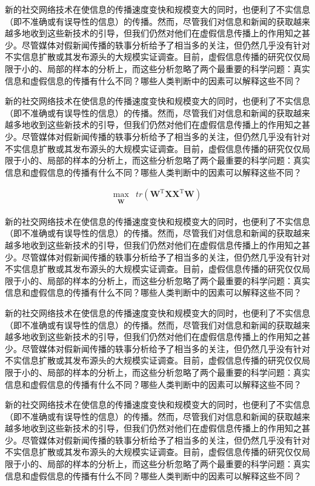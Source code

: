 \documentclass[a4paper,AutoFakeBold,oneside,12pt]{book}
\begin{document}
\begin{nopagenumber}
新的社交网络技术在使信息的传播速度变快和规模变大的同时，也便利了不实信息（即不准确或有误导性的信息）的传播。然而，尽管我们对信息和新闻的获取越来越多地收到这些新技术的引导，但我们仍然对他们在虚假信息传播上的作用知之甚少。尽管媒体对假新闻传播的轶事分析给予了相当多的关注，但仍然几乎没有针对不实信息扩散或其发布源头的大规模实证调查。目前，虚假信息传播的研究仅仅局限于小的、局部的样本的分析上，而这些分析忽略了两个最重要的科学问题：真实信息和虚假信息的传播有什么不同？哪些人类判断中的因素可以解释这些不同？

新的社交网络技术在使信息的传播速度变快和规模变大的同时，也便利了不实信息（即不准确或有误导性的信息）的传播。然而，尽管我们对信息和新闻的获取越来越多地收到这些新技术的引导，但我们仍然对他们在虚假信息传播上的作用知之甚少。尽管媒体对假新闻传播的轶事分析给予了相当多的关注，但仍然几乎没有针对不实信息扩散或其发布源头的大规模实证调查。目前，虚假信息传播的研究仅仅局限于小的、局部的样本的分析上，而这些分析忽略了两个最重要的科学问题：真实信息和虚假信息的传播有什么不同？哪些人类判断中的因素可以解释这些不同？

\begin{equation}
\label{PCA_goal_appx2}
\begin{aligned}
\max_{\substack{\bm{W}}}  &  tr(\bm{W}^\mathrm{T}\bm{X}\bm{X}^ \mathrm{T}\bm{W})
\end{aligned}
\end{equation}

新的社交网络技术在使信息的传播速度变快和规模变大的同时，也便利了不实信息（即不准确或有误导性的信息）的传播。然而，尽管我们对信息和新闻的获取越来越多地收到这些新技术的引导，但我们仍然对他们在虚假信息传播上的作用知之甚少。尽管媒体对假新闻传播的轶事分析给予了相当多的关注，但仍然几乎没有针对不实信息扩散或其发布源头的大规模实证调查。目前，虚假信息传播的研究仅仅局限于小的、局部的样本的分析上，而这些分析忽略了两个最重要的科学问题：真实信息和虚假信息的传播有什么不同？哪些人类判断中的因素可以解释这些不同？

新的社交网络技术在使信息的传播速度变快和规模变大的同时，也便利了不实信息（即不准确或有误导性的信息）的传播。然而，尽管我们对信息和新闻的获取越来越多地收到这些新技术的引导，但我们仍然对他们在虚假信息传播上的作用知之甚少。尽管媒体对假新闻传播的轶事分析给予了相当多的关注，但仍然几乎没有针对不实信息扩散或其发布源头的大规模实证调查。目前，虚假信息传播的研究仅仅局限于小的、局部的样本的分析上，而这些分析忽略了两个最重要的科学问题：真实信息和虚假信息的传播有什么不同？哪些人类判断中的因素可以解释这些不同？

新的社交网络技术在使信息的传播速度变快和规模变大的同时，也便利了不实信息（即不准确或有误导性的信息）的传播。然而，尽管我们对信息和新闻的获取越来越多地收到这些新技术的引导，但我们仍然对他们在虚假信息传播上的作用知之甚少。尽管媒体对假新闻传播的轶事分析给予了相当多的关注，但仍然几乎没有针对不实信息扩散或其发布源头的大规模实证调查。目前，虚假信息传播的研究仅仅局限于小的、局部的样本的分析上，而这些分析忽略了两个最重要的科学问题：真实信息和虚假信息的传播有什么不同？哪些人类判断中的因素可以解释这些不同？


\end{nopagenumber}
\end{document}
